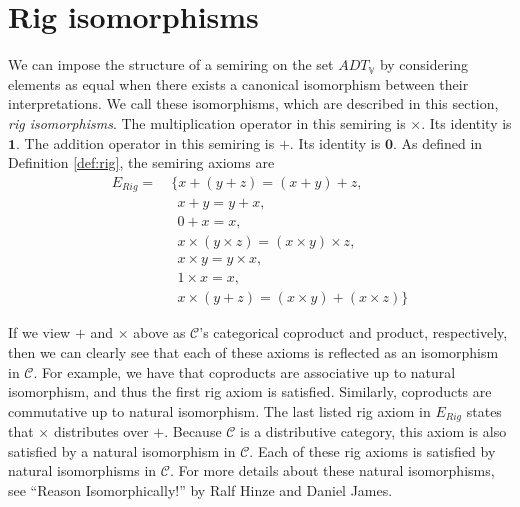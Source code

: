 \documentclass{msthesis}
\theoremstyle{definition}
\newcommand{\mcC}{\mathcal{C}}
\newcommand{\vars}{\mathbb{V}}
\begin{document}
\section{Rig isomorphisms}\label{sec:rigiso}

We can impose the structure of a semiring on the set $ADT_\vars$ by considering elements as equal when there exists a canonical isomorphism between their interpretations.  We call these isomorphisms, which are described in this section, \emph{rig isomorphisms}. The multiplication operator in this semiring is $\times$.  Its identity is $\mathbf{1}$.  The addition operator in this semiring is $+$. Its identity is $\mathbf{0}$.  As defined in Definition \ref{def:rig}, the semiring axioms are
\begin{align*}
    E_{Rig} =&\ \{x+(y+z) =(x+y)+z, \\
             &\ \ \ x + y = y + x,\\
             &\ \ \ 0 + x = x, \\
             &\ \ \ x\times(y\times z) = (x \times y) \times z, \\
             &\ \ \ x \times y = y \times x, \\
             &\ \ \ 1 \times x = x, \\
             &\ \ \ x \times (y + z) = (x \times y) + (x \times z)\}
\end{align*}

If we view $+$ and $\times$ above as $\mcC$'s categorical coproduct and product, respectively, then we can clearly see that each of these axioms is reflected as an isomorphism in $\mcC$.  For example, we have that coproducts are associative up to natural isomorphism, and thus the first rig axiom is satisfied.  Similarly, coproducts are commutative up to natural isomorphism.  The last listed rig axiom in $E_{Rig}$ states that $\times$ distributes over $+$.  Because $\mcC$ is a distributive category, this axiom is also satisfied by a natural isomorphism in $\mcC$.  Each of these rig axioms is satisfied by natural isomorphisms in $\mcC$.  For more details about these natural isomorphisms, see ``Reason Isomorphically!'' \cite{10.1145/1863495.1863507} by Ralf Hinze and Daniel James.
\end{document}
